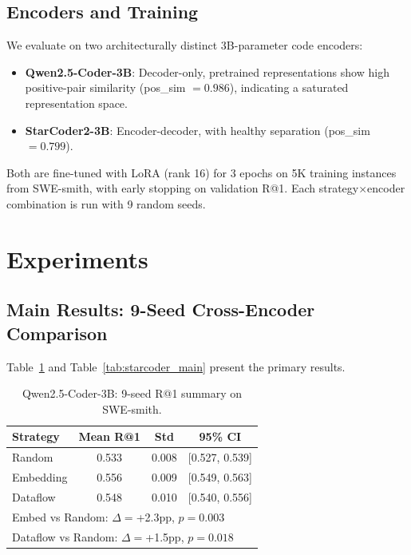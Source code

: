 \documentclass[11pt,a4paper]{article}
\begin{document}
\subsection{Encoders and Training}

We evaluate on two architecturally distinct 3B-parameter code encoders:
\begin{itemize}
\item \textbf{Qwen2.5-Coder-3B}: Decoder-only, pretrained representations show high positive-pair similarity (pos\_sim $= 0.986$), indicating a saturated representation space.
\item \textbf{StarCoder2-3B}: Encoder-decoder, with healthy separation (pos\_sim $= 0.799$).
\end{itemize}

Both are fine-tuned with LoRA (rank 16) for 3 epochs on 5K training instances from SWE-smith, with early stopping on validation R@1. Each strategy$\times$encoder combination is run with 9 random seeds.

\section{Experiments}

\subsection{Main Results: 9-Seed Cross-Encoder Comparison}
\label{sec:main}

Table~\ref{tab:qwen_main} and Table~\ref{tab:starcoder_main} present the primary results.

\begin{table}[t]
\centering
\small
\caption{Qwen2.5-Coder-3B: 9-seed R@1 summary on SWE-smith.}
\label{tab:qwen_main}
\begin{tabular}{lccc}
\toprule
\textbf{Strategy} & \textbf{Mean R@1} & \textbf{Std} & \textbf{95\% CI} \\
\midrule
Random & 0.533 & 0.008 & [0.527, 0.539] \\
Embedding & 0.556 & 0.009 & [0.549, 0.563] \\
Dataflow & 0.548 & 0.010 & [0.540, 0.556] \\
\midrule
\multicolumn{4}{l}{\small Embed vs Random: $\Delta{=}$+2.3pp, $p{=}0.003$} \\
\multicolumn{4}{l}{\small Dataflow vs Random: $\Delta{=}$+1.5pp, $p{=}0.018$} \\
\bottomrule
\end{tabular}
\end{table}
\end{document}
